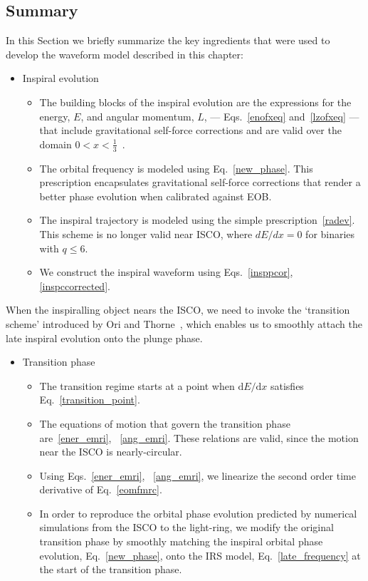 \subsection{Summary}
In this Section we briefly summarize the key ingredients that were used to develop the waveform model described in this chapter:
\begin{itemize}
\item{Inspiral evolution}
\begin{itemize}
\item The building blocks of the inspiral evolution are the expressions for the energy, \(E\), and angular momentum, \(L\), --- Eqs.~\eqref{enofxeq} and~\eqref{lzofxeq} --- that include gravitational self-force corrections and are valid over the domain \(0<x<\frac{1}{3}\)~\cite{Akcay:2012}.
\item The orbital frequency is modeled using Eq.~\eqref{new_phase}. This prescription encapsulates gravitational self-force corrections that render a better phase evolution when calibrated against EOB.
\item The inspiral trajectory is modeled using the simple prescription~\eqref{radev}. This scheme is no longer valid near ISCO, where \(dE/dx =0\) for binaries with \(q\leq 6\).
\item We construct the inspiral waveform using Eqs.~\eqref{insppcor}, \eqref{inspccorrected}.
\end{itemize}
\end{itemize}

When the inspiralling object nears the ISCO, we need to invoke the `transition scheme' introduced by Ori and Thorne~\cite{amos}, which enables us to smoothly attach the late inspiral evolution onto the plunge phase. 

\begin{itemize}
\item{Transition phase}
\begin{itemize}
\item The transition regime starts at a point when \( \mathrm{d} E/ \mathrm{d}  x\) satisfies Eq.~\eqref{transition_point}.
\item The equations of motion that govern the transition phase are~\eqref{ener_emri}, ~\eqref{ang_emri}. These relations are valid, since the motion near the ISCO is nearly-circular. 
\item Using Eqs.~\eqref{ener_emri}, ~\eqref{ang_emri}, we linearize the second order time derivative of Eq.~\eqref{eomfmrc}.
\item In order to reproduce the orbital phase evolution predicted by numerical simulations from the ISCO to the light-ring, we modify the original transition phase by smoothly matching the inspiral orbital phase evolution, Eq.~\eqref{new_phase}, onto the IRS model, Eq.~\eqref{late_frequency} at the start of the transition phase. 
\end{itemize}
\end{itemize}

